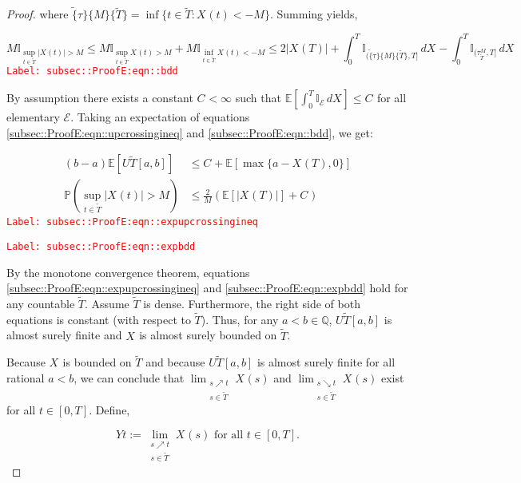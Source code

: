 \documentclass[12pt]{article}
\newcommand{\mb}{\mathbb}
\newcommand{\mc}{\mathcal}
\newcommand{\te}{\text}
\newcommand{\tr}{\textcolor{red}}
\newcommand{\labe}[1]{\tr{\texttt{Label: #1}}}
\newcommand{\ind}{\hspace{24pt}}
\newcommand{\pr}{\mb{P}}							%
\newcommand{\ex}[1]{\mb{E}\left[#1\right]}			%
\newcommand{\T}{T}								%
\renewcommand{\t}{t}							%
\renewcommand{\tt}{s}							%
\newcommand{\X}{X}								%
\newcommand{\cind}[1]{_{#1}}					%
\newcommand{\tp}[1]{(#1)}						%
\newcommand{\tip}[1]{#1}						%
\newcommand{\const}{C}							%
\newcommand{\alt}[1]{\widetilde{#1}}			%
\newcommand{\indx}[1]{_{#1}}					%
\newcommand{\XX}{Y}								%
\newcommand{\rt}{\tau}							%
\newcommand{\evnt}{\mc{E}}						%
\newcommand{\Tset}{\alt{T}}						%
\newcommand{\upcrs}{U}							%
\newcommand{\gid}[1]{^{#1}}						%
\newcommand{\gidd}[1]{_{#1}}					%
\begin{document}
\begin{proof}
where \(\alt\{\rt\}\{M\}\{\Tset\} = \inf\{\t\in \Tset: \X\cind{}\tp{\t} < -M\}\). Summing yields,

\begin{equation}
M\mb{I}_{\sup_{\t\in\Tset}|\X\cind{}\tp{\t}| > M} \leq M\mb{I}_{\sup_{\t\in\Tset}\X\cind{}\tp{\t} > M} + M\mb{I}_{\inf_{\t\in\Tset}\X\cind{}\tp{\t} < -M} \leq 2|\X\cind{}\tp{\T}| + \int_0^\T \mb{I}_{(\alt\{\rt\}\{M\}\{\Tset\},\T]}\,d\X\cind{}\tip{} - \int_0^\T \mb{I}_{(\rt\gid{M}\gidd{\Tset},\T]}\,d\X\cind{}\tip{}
\label{subsec::ProofE:eqn::bdd}
\end{equation}
\labe{subsec::ProofE:eqn::bdd}

By assumption there exists a constant \(\const\indx{} < \infty\) such that \(\ex{\int_0^\T \mb{I}_{\evnt}\,d\X\cind{}\tip{}} \leq \const\indx{}\) for all elementary \(\evnt{}\). Taking an expectation of equations \eqref{subsec::ProofE:eqn::upcrossingineq} and \eqref{subsec::ProofE:eqn::bdd}, we get:

\begin{align}
(b-a)\ex{\upcrs{\Tset}[a,b]} &\leq \const\indx{} + \ex{\max\{a-\X\cind{}\tp{\T},0\}}
\label{subsec::ProofE:eqn::expupcrossingineq}\\
\pr\left(\sup_{\t\in\Tset} |\X\cind{}\tp{\t}| > M\right) &\leq \frac{2}{M}\left(\ex{|\X\cind{}\tp{\T}|} + \const\indx{}\right)
\label{subsec::ProofE:eqn::expbdd}
\end{align}
\labe{subsec::ProofE:eqn::expupcrossingineq}

\labe{subsec::ProofE:eqn::expbdd}

By the monotone convergence theorem, equations \eqref{subsec::ProofE:eqn::expupcrossingineq} and \eqref{subsec::ProofE:eqn::expbdd} hold for any countable \(\Tset\). Assume \(\Tset\) is dense. Furthermore, the right side of both equations is constant (with respect to \(\Tset\)). Thus, for any \(a < b \in \mb{Q}\), \(\upcrs{\Tset}[a,b]\) is almost surely finite and \(\X\cind{}\tip{}\) is almost surely bounded on \(\Tset\).

\ind Because \(\X\cind{}\tip{}\) is bounded on \(\Tset\) and because \(\upcrs{\Tset}[a,b]\) is almost surely finite for all rational \(a < b\), we can conclude that \(\lim_{\substack{\tt \nearrow \t\\ \tt \in \Tset}} \X\cind{}\tp{\tt}\) and \(\lim_{\substack{\tt \searrow \t\\ \tt \in \Tset}} \X\cind{}\tp{\tt}\) exist for all \(\t \in [0,\T]\). Define,

\[\XX{}{\t} := \lim_{\substack{\tt \nearrow \t\\\tt \in \Tset}} \X\cind{}\tp{\tt}\te{ for all } \t \in [0,\T].\]


\end{proof}
\end{document}
